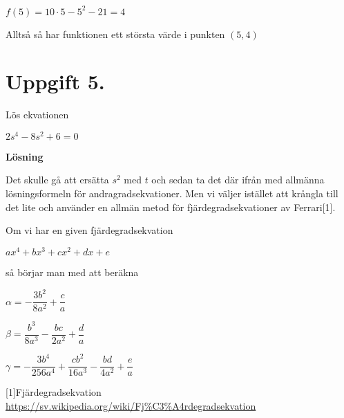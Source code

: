 \documentclass{article}
\begin{document}
$f(5)=10\cdot5-5^2-21=4$

Alltså så har funktionen ett största värde i punkten $(5,4)$

\section*{Uppgift 5.}
Lös ekvationen

$2s^4-8s^2+6=0$

\textbf{Lösning}

Det skulle gå att ersätta $s^2$ med $t$ och sedan ta det där ifrån med allmänna lösningsformeln för andragradsekvationer. Men vi väljer istället att krångla till det lite och använder en allmän metod för fjärdegradsekvationer av Ferrari[1].

Om vi har en given fjärdegradsekvation

$ax^4+bx^3+cx^2+dx+e$

så börjar man med att beräkna 

$\alpha = -\dfrac{3b^2}{8a^2} + \dfrac{c}{a}$

$\beta = \dfrac{b^3}{8a^3} - \dfrac{bc}{2a^2} + \dfrac{d}{a}$

$\gamma = -\dfrac{3b^4}{256a^4} + \dfrac{cb^2}{16a^3} - \dfrac{bd}{4a^2} + \dfrac{e}{a}$

[1]Fjärdegradsekvation \url{https://sv.wikipedia.org/wiki/Fj\%C3\%A4rdegradsekvation}
\end{document}
